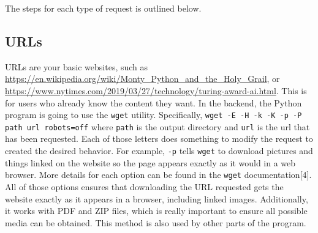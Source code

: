 \documentclass{article}
\begin{document}
The steps for each type of request is outlined below.

\subsection{URLs}

URLs are your basic websites, such as
\url{https://en.wikipedia.org/wiki/Monty_Python_and_the_Holy_Grail},
or
\url{https://www.nytimes.com/2019/03/27/technology/turing-award-ai.html}. This
is for users who already know the content they want. In the backend,
the Python program is going to use the \texttt{wget}
utility. Specifically, \texttt{wget -E -H -k -K -p -P path url
  robots=off} where \texttt{path} is the output directory and
\texttt{url} is the url that has been requested. Each of those letters
does something to modify the request to created the desired
behavior. For example, \texttt{-p} tells \texttt{wget} to download pictures and
things linked on the website so the page appears exactly as it would
in a web browser. More details for each option can be found in the
\texttt{wget} documentation[4].
All of those options ensures that downloading the URL requested gets
the website exactly as it appears in a browser, including linked
images. Additionally, it works with PDF and ZIP files, which is really
important to ensure all possible media can be obtained. This method is
also used by other parts of the program.
\end{document}
